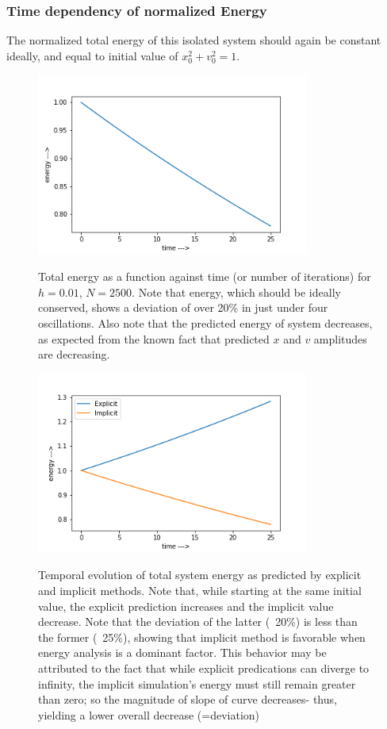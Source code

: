 \documentclass{report}
\begin{document}
\subsubsection*{Time dependency of normalized Energy}
The normalized total energy of this isolated system should again be constant ideally, and equal to initial value of $x_0^2 + v_0^2 = 1$.
\begin{figure}[H]
	\centering
	\includegraphics[width = 0.8\textwidth]{energyi1.png}
	\label{en1i}
	\caption{Total energy as a function against time (or number of iterations) for $h=0.01$, $N=2500$. Note that energy, which should be ideally conserved, shows a deviation of over 20\% in just under four oscillations. Also note that the predicted energy of system decreases, as expected from the known fact that predicted $x$ and $v$ amplitudes are decreasing.}
\end{figure}
\begin{figure}[H]
	\centering
	\includegraphics[width = 0.8\textwidth]{compareE.png}
	\label{bothen}
	\caption{Temporal evolution of total system energy as predicted by explicit and implicit methods. Note that, while starting at the same initial value, the explicit prediction increases and the implicit value decrease. Note that the deviation of the latter (~20\%) is less than the former (~25\%), showing that implicit method is favorable when energy analysis is a dominant factor. This behavior may be attributed to the fact that while explicit predications can diverge to infinity, the implicit simulation's energy must still remain greater than zero; so the magnitude of slope of curve decreases- thus, yielding a lower overall decrease (=deviation)}
\end{figure}
\end{document}
